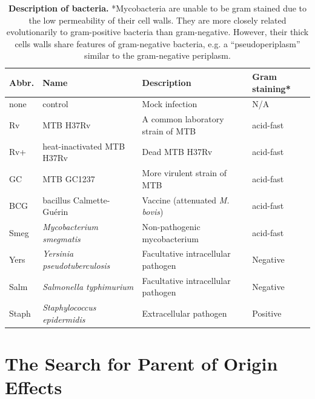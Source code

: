 \begin{table}
\centering
\begin{tabular}{@{}llll@{}}
\toprule Abbr. & Name & Description & Gram staining* \\ \midrule none
& control & Mock infection & N/A \\ Rv & MTB H37Rv & A common
laboratory strain of MTB & acid-fast \\ Rv+ & heat-inactivated MTB
H37Rv & Dead MTB H37Rv & acid-fast \\ GC & MTB GC1237 & More virulent
strain of MTB & acid-fast \\ BCG & bacillus Calmette-Gu\'{e}rin &
Vaccine (attenuated \emph{M. bovis}) & acid-fast \\ Smeg &
\emph{Mycobacterium smegmatis} & Non-pathogenic mycobacterium &
acid-fast \\ Yers & \emph{Yersinia pseudotuberculosis} & Facultative
intracellular pathogen & Negative \\ Salm & \emph{Salmonella
  typhimurium} & Facultative intracellular pathogen & Negative
\\ Staph & \emph{Staphylococcus epidermidis} & Extracellular pathogen
& Positive \\ \bottomrule
\end{tabular}
\caption[Description of bacteria.]{\textbf{Description of bacteria.}
  *Mycobacteria are unable to be gram stained due to the low
  permeability of their cell walls. They are more closely related
  evolutionarily to gram-positive bacteria than
  gram-negative. However, their thick cells walls share features of
  gram-negative bacteria, e.g. a ``pseudoperiplasm'' similar to the
  gram-negative periplasm.}
\label{tab:imprinteddisease}
\end{table}


\section{The Search for Parent of Origin Effects}


